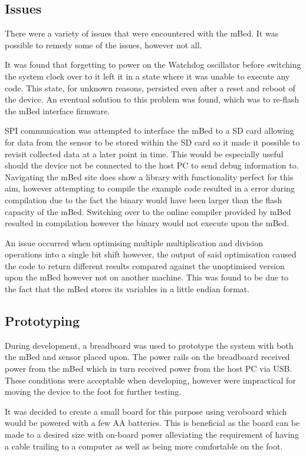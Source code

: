 \subsection{Issues}

There were a variety of issues that were encountered with the mBed. It was possible to remedy some of the issues, however not all.

It was found that forgetting to power on the Watchdog oscillator before switching the system clock over to it left it in a state where it was unable to execute any code. This state, for unknown reasons, persisted even after a reset and reboot of the device. An eventual solution to this problem was found, which was to re-flash the mBed interface firmware.

SPI communication was attempted to interface the mBed to a SD card allowing for data from the sensor to be stored within the SD card so it made it possible to revisit collected data at a later point in time. This would be especially useful should the device not be connected to the host PC to send debug information to. Navigating the mBed site does show a library with functionality perfect for this aim, however attempting to compile the example code resulted in a error during compilation due to the fact the binary would have been larger than the flash capacity of the mBed. Switching over to the online compiler provided by mBed resulted in compilation however the binary would not execute upon the mBed.

An issue occurred when optimising multiple multiplication and division operations into a single bit shift however, the output of said optimisation caused the code to return different results compared against the unoptimised version upon the mBed however not on another machine. This was found to be due to the fact that the mBed stores its variables in a little endian format.

\subsection{Prototyping}

During development, a breadboard was used to prototype the system with both the mBed and sensor placed upon. The power rails on the breadboard received power from the mBed which in turn received power from the host PC via USB. These conditions were acceptable when developing, however were impractical for moving the device to the foot for further testing. 

It was decided to create a small board for this purpose using veroboard which would be powered with a few AA batteries. This is beneficial as the board can be made to a desired size with on-board power alleviating the requirement of having a cable trailing to a computer as well as being more comfortable on the foot.

